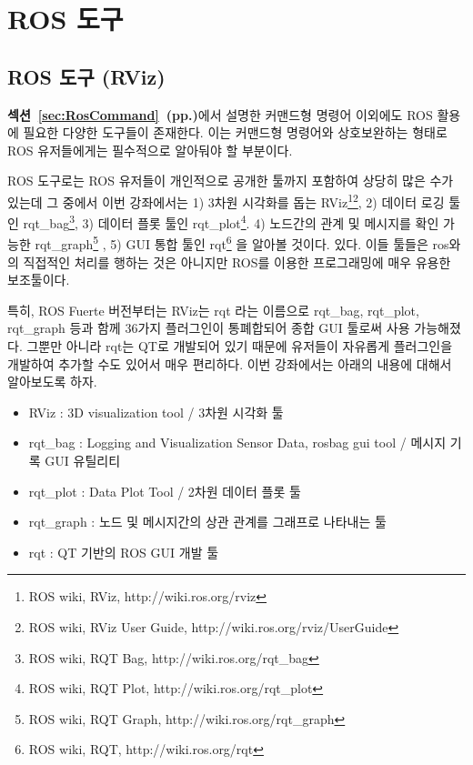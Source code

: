 
\chapter{ROS 도구}

\section{ROS 도구 (RViz)}

\textbf{섹션~\ref{sec:RosCommand}~(pp.\pageref{sec:RosCommand})}에서 설명한 커맨드형 명령어 이외에도 ROS 활용에 필요한 다양한 도구들이 존재한다. 이는 커맨드형 명령어와 상호보완하는 형태로 ROS 유저들에게는 필수적으로 알아둬야 할 부분이다.

ROS 도구로는 ROS 유저들이 개인적으로 공개한 툴까지 포함하여 상당히 많은 수가 있는데 그 중에서 이번 강좌에서는 1) 3차원 시각화를 돕는 RViz\footnote{ROS wiki, RViz, http://wiki.ros.org/rviz}\footnote{ROS wiki, RViz User Guide, http://wiki.ros.org/rviz/UserGuide}, 2) 데이터 로깅 툴인 rqt\_bag\footnote{ROS wiki, RQT Bag, http://wiki.ros.org/rqt\_bag}, 3) 데이터 플롯 툴인 rqt\_plot\footnote{ROS wiki, RQT Plot, http://wiki.ros.org/rqt\_plot}. 4) 노드간의 관계 및 메시지를 확인 가능한 rqt\_graph\footnote{ROS wiki, RQT Graph, http://wiki.ros.org/rqt\_graph} , 5) GUI 통합 툴인 rqt\footnote{ROS wiki, RQT, http://wiki.ros.org/rqt} 을 알아볼 것이다. 있다. 이들 툴들은 ros와의 직접적인 처리를 행하는 것은 아니지만 ROS를 이용한 프로그래밍에 매우 유용한 보조툴이다. 

특히, ROS Fuerte 버전부터는 RViz는 rqt 라는 이름으로 rqt\_bag, rqt\_plot, rqt\_graph 등과 함께 36가지 플러그인이 통폐합되어 종합 GUI 툴로써 사용 가능해졌다. 그뿐만 아니라 rqt는 QT로 개발되어 있기 때문에 유저들이 자유롭게 플러그인을 개발하여 추가할 수도 있어서 매우 편리하다. 이번 강좌에서는 아래의 내용에 대해서 알아보도록 하자.

\vspace{\baselineskip}
\begin{itemize}[leftmargin=*]
\item RViz : 3D visualization tool / 3차원 시각화 툴
\item rqt\_bag : Logging and Visualization Sensor Data, rosbag gui tool / 메시지 기록 GUI 유틸리티
\item rqt\_plot : Data Plot Tool / 2차원 데이터 플롯 툴 
\item rqt\_graph : 노드 및 메시지간의 상관 관계를 그래프로 나타내는 툴
\item rqt : QT 기반의 ROS GUI 개발 툴
\end{itemize}

